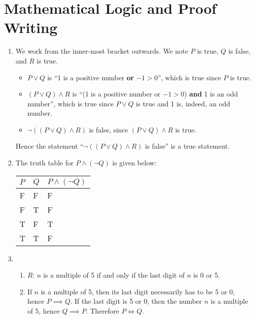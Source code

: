 \section{Mathematical Logic and Proof Writing}
\begin{enumerate}
    \item We work from the inner-most bracket outwards. We note $P$ is true, $Q$ is false, and $R$ is true.
    \begin{itemize}
        \item $P \lor Q$ is ``1 is a positive number \textbf{or} $-1 > 0$'', which is true since $P$ is true.
        \item $(P \lor Q) \land R$ is ``(1 is a positive number or $-1 > 0$) \textbf{and} 1 is an odd number'', which is true since $P \lor Q$ is true and 1 is, indeed, an odd number.
        \item $\lnot((P \lor Q) \land R)$ is false, since $(P \lor Q) \land R$ is true.
    \end{itemize}
    Hence the statement ``$\lnot((P \lor Q) \land R)$ is false'' is a true statement.
    
    \item The truth table for $P \land (\lnot Q)$ is given below:
    \begin{table}[h]
        \centering
        \begin{tabular}{|l|l||l|}
            \hline
            $P$ & $Q$ & $P\land (\lnot Q)$ \\ \hline
            F   & F   & F                  \\ \hline
            F   & T   & F                  \\ \hline
            T   & F   & T                  \\ \hline
            T   & T   & F                  \\ \hline
        \end{tabular}
    \end{table}
    
    \item \begin{enumerate}[label=(\roman*)]
        \item $R$: $n$ is a multiple of 5 if and only if the last digit of $n$ is 0 or 5.
        \item If $n$ is a multiple of 5, then its last digit necessarily has to be 5 or 0, hence $P \implies Q$. If the last digit is 5 or 0, then the number $n$ is a multiple of 5, hence $Q \implies P$. Therefore $P \iff Q$.
    \end{enumerate}
    

\end{enumerate}
